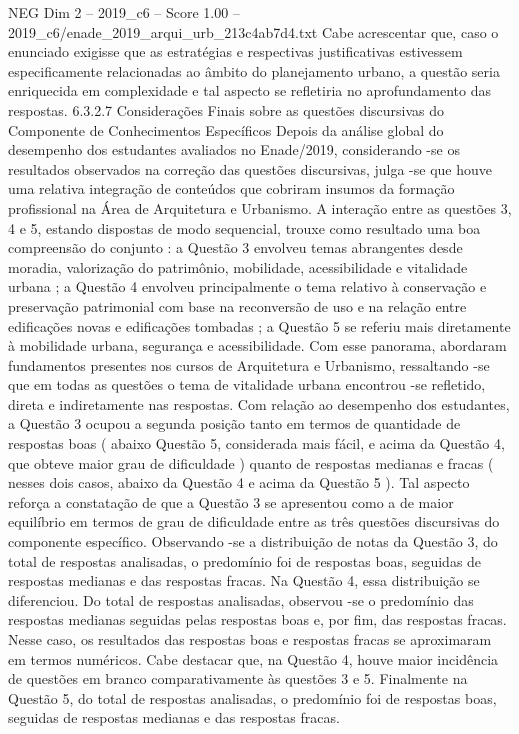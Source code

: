 \begin{textsample}{NEG Dim 2 – 2019\_c6 – Score 1.00 – 2019\_c6/enade\_2019\_arqui\_urb\_213c4ab7d4.txt}
Cabe acrescentar que, caso o enunciado exigisse que as estratégias e respectivas justificativas estivessem especificamente relacionadas ao âmbito do planejamento urbano, a questão seria enriquecida em complexidade e tal aspecto se refletiria no aprofundamento das respostas. 6.3.2.7 Considerações Finais sobre as questões discursivas do Componente de Conhecimentos Específicos Depois da análise global do desempenho dos estudantes avaliados no Enade/2019, considerando -se os resultados observados na correção das questões discursivas, julga -se que houve uma relativa integração de conteúdos que cobriram insumos da formação profissional na Área de Arquitetura e Urbanismo.
A interação entre as questões 3, 4 e 5, estando dispostas de modo sequencial, trouxe como resultado uma boa compreensão do conjunto : a Questão 3 envolveu temas abrangentes desde moradia, valorização do patrimônio, mobilidade, acessibilidade e vitalidade urbana ; a Questão 4 envolveu principalmente o tema relativo à conservação e preservação patrimonial com base na reconversão de uso e na relação entre edificações novas e edificações tombadas ; a Questão 5 se referiu mais diretamente à mobilidade urbana, segurança e acessibilidade.
Com esse panorama, abordaram fundamentos presentes nos cursos de Arquitetura e Urbanismo, ressaltando -se que em todas as questões o tema de vitalidade urbana encontrou -se refletido, direta e indiretamente nas respostas.
Com relação ao desempenho dos estudantes, a Questão 3 ocupou a segunda posição tanto em termos de quantidade de respostas boas ( abaixo Questão 5, considerada mais fácil, e acima da Questão 4, que obteve maior grau de dificuldade ) quanto de respostas medianas e fracas ( nesses dois casos, abaixo da Questão 4 e acima da Questão 5 ).
Tal aspecto reforça a constatação de que a Questão 3 se apresentou como a de maior equilíbrio em termos de grau de dificuldade entre as três questões discursivas do componente específico.
Observando -se a distribuição de notas da Questão 3, do total de respostas analisadas, o predomínio foi de respostas boas, seguidas de respostas medianas e das respostas fracas.
Na Questão 4, essa distribuição se diferenciou.
Do total de respostas analisadas, observou -se o predomínio das respostas medianas seguidas pelas respostas boas e, por fim, das respostas fracas.
Nesse caso, os resultados das respostas boas e respostas fracas se aproximaram em termos numéricos.
Cabe destacar que, na Questão 4, houve maior incidência de questões em branco comparativamente às questões 3 e 5.
Finalmente na Questão 5, do total de respostas analisadas, o predomínio foi de respostas boas, seguidas de respostas medianas e das respostas fracas.

\end{textsample}
